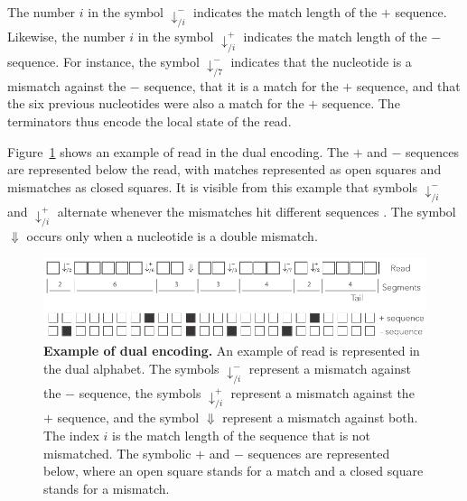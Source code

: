 \documentclass{article}
\begin{document}
The number $i$ in the symbol $\downarrow_{/i}^-$ indicates the match
length of the $+$ sequence. Likewise, the number $i$ in the symbol
$\downarrow_{/i}^+$ indicates the match length of the $-$ sequence. For
instance, the symbol $\downarrow_{/7}^-$ indicates that the nucleotide is a
mismatch against the $-$ sequence, that it is a match for the $+$
sequence, and that the six previous nucleotides were also a match for the
$+$ sequence. The terminators thus encode the local state of the read.

Figure~\ref{fig:dual} shows an example of read in the dual encoding. The $+$
and $-$ sequences are represented below the read, with matches represented
as open squares and mismatches as closed squares. It is visible from this
example that symbols $\downarrow^-_{/i}$ and $\downarrow^+_{/i}$ alternate
whenever the mismatches hit different sequences . The symbol $\Downarrow$
occurs only when a nucleotide is a double mismatch.

\begin{figure}[h]
\centering
\includegraphics[scale=0.85]{sketch_dual.pdf}
\caption{\textbf{Example of dual encoding.}
An example of read is represented in the dual alphabet. The symbols
$\downarrow_{/i}^-$ represent a mismatch against the $-$ sequence, the
symbols $\downarrow_{/i}^+$ represent a mismatch against the $+$ sequence,
and the symbol $\Downarrow$ represent a mismatch against both. The index
$i$ is the match length of the sequence that is not mismatched. The
symbolic $+$ and $-$ sequences are represented below, where an open square
stands for a match and a closed square stands for a mismatch.}
\label{fig:dual}
\end{figure}
\end{document}
